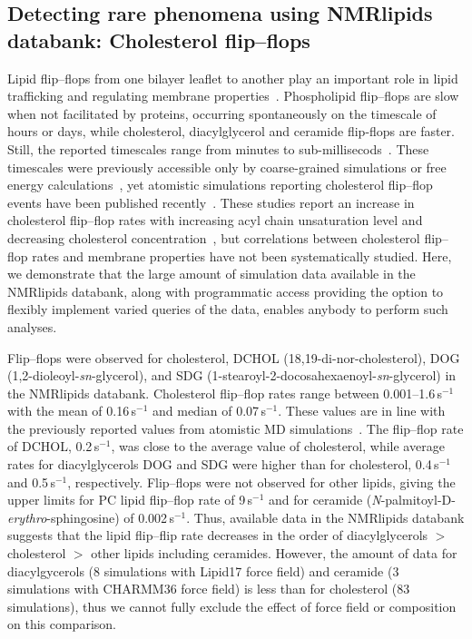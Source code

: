 \documentclass[fleqn,10pt]{wlscirep}
\begin{document}
\subsection{Detecting rare phenomena using NMRlipids databank: Cholesterol flip--flops}
Lipid flip--flops from one bilayer leaflet to another play an important role in lipid trafficking and regulating membrane properties~\cite{vanmeer08}. Phospholipid flip--flops are slow when not facilitated by proteins, occurring spontaneously on the timescale of hours or days, while cholesterol, diacylglycerol and ceramide flip-flops are faster. Still, the reported timescales range from minutes to sub-millisecods~\cite{vanmeer08,steck12,parisio16,gu19}. These timescales were previously accessible only by coarse-grained simulations or free energy calculations~\cite{parisio16}, yet atomistic simulations reporting cholesterol flip--flop events have been published recently~\cite{gu19,javanainen19,baral20}. 
These studies report an increase in cholesterol flip--flop rates with increasing acyl chain unsaturation level and decreasing cholesterol concentration~\cite{gu19,javanainen19}, but correlations between cholesterol flip--flop rates and membrane properties have not been systematically studied. Here, we demonstrate that the large amount of simulation data available in the NMRlipids databank, along with programmatic access providing the option to flexibly implement varied queries of the data, enables anybody to perform such analyses.


Flip--flops were observed for cholesterol, %
DCHOL (18,19-di-nor-cholesterol), %
DOG (1,2-dioleoyl-\textit{sn}-glycerol), %
and SDG (1-stearoyl-2-docosahexaenoyl-\textit{sn}-glycerol) in the NMRlipids databank. Cholesterol flip--flop rates range between 0.001--1.6\,\textmu{}s$^{-1}$ with the mean of 0.16\,\textmu{}s$^{-1}$ and median of 0.07\,\textmu{}s$^{-1}$. These values are in line with the previously reported values from atomistic MD simulations~\cite{gu19,javanainen19,baral20}. The flip--flop rate of DCHOL, 0.2\,\textmu{}s$^{-1}$, was close to the average value of cholesterol, while average rates for diacylglycerols DOG and SDG were higher than for cholesterol, 0.4\,\textmu{}s$^{-1}$ and 0.5\,\textmu{}s$^{-1}$, respectively. Flip--flops were not observed for other lipids, giving the upper limits for PC lipid flip--flop rate of 9\,s$^{-1}$ and for ceramide (\textit{N}-palmitoyl-\textsc{D}-\textit{erythro}-sphingosine) of 0.002\,\textmu{}s$^{-1}$. Thus, available data in the NMRlipids databank suggests that the lipid flip--flip rate decreases in the order of diacylglycerols $>$ cholesterol $>$ other lipids including ceramides. However, the amount of data for diacylgycerols (8 simulations with Lipid17 force field) and ceramide (3 simulations with CHARMM36 force field) is less than for cholesterol (83 simulations), thus we cannot fully exclude the effect of force field or composition on this comparison.
\end{document}
